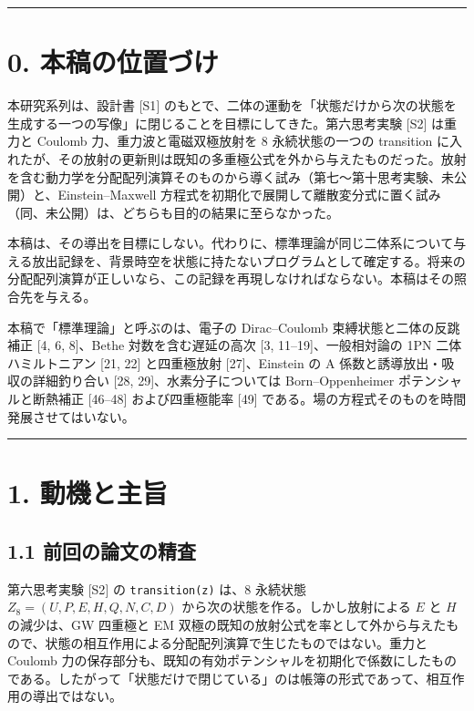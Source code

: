 \documentclass[
  a4paper,
]{ltjsarticle}
\begin{document}
\begin{center}\rule{0.5\linewidth}{0.5pt}\end{center}

\section{0.
本稿の位置づけ}\label{ux672cux7a3fux306eux4f4dux7f6eux3065ux3051}

本研究系列は、設計書 {[}S1{]}
のもとで、二体の運動を「状態だけから次の状態を生成する一つの写像」に閉じることを目標にしてきた。第六思考実験
{[}S2{]} は重力と Coulomb 力、重力波と電磁双極放射を 8 永続状態の一つの
transition
に入れたが、その放射の更新則は既知の多重極公式を外から与えたものだった。放射を含む動力学を分配配列演算そのものから導く試み（第七〜第十思考実験、未公開）と、Einstein--Maxwell
方程式を初期化で展開して離散変分式に置く試み（同、未公開）は、どちらも目的の結果に至らなかった。

本稿は、その導出を目標にしない。代わりに、標準理論が同じ二体系について与える放出記録を、背景時空を状態に持たないプログラムとして確定する。将来の分配配列演算が正しいなら、この記録を再現しなければならない。本稿はその照合先を与える。

本稿で「標準理論」と呼ぶのは、電子の Dirac--Coulomb
束縛状態と二体の反跳補正 {[}4, 6, 8{]}、Bethe 対数を含む遅延の高次 {[}3,
11--19{]}、一般相対論の 1PN 二体ハミルトニアン {[}21, 22{]} と四重極放射
{[}27{]}、Einstein の A 係数と誘導放出・吸収の詳細釣り合い {[}28,
29{]}、水素分子については Born--Oppenheimer ポテンシャルと断熱補正
{[}46--48{]} および四重極能率 {[}49{]}
である。場の方程式そのものを時間発展させてはいない。

\begin{center}\rule{0.5\linewidth}{0.5pt}\end{center}

\section{1. 動機と主旨}\label{ux52d5ux6a5fux3068ux4e3bux65e8}

\subsection{1.1
前回の論文の精査}\label{ux524dux56deux306eux8ad6ux6587ux306eux7cbeux67fb}

第六思考実験 {[}S2{]} の \texttt{transition(z)} は、8 永続状態
\(Z_8=(U,P,E,H,Q,N,C,D)\) から次の状態を作る。しかし放射による \(E\) と
\(H\) の減少は、GW 四重極と EM
双極の既知の放射公式を率として外から与えたもので、状態の相互作用による分配配列演算で生じたものではない。重力と
Coulomb
力の保存部分も、既知の有効ポテンシャルを初期化で係数にしたものである。したがって「状態だけで閉じている」のは帳簿の形式であって、相互作用の導出ではない。
\end{document}
